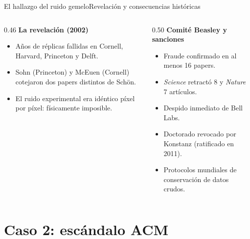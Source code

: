 \documentclass[11pt,aspectratio=169,xcolor=table]{beamer}
\begin{document}
\begin{frame}{El hallazgo del ruido gemelo}{Revelación y consecuencias históricas}
  \begin{columns}[T,onlytextwidth]
    \begin{column}{0.46\textwidth}
      \textbf{La revelación (2002)}
      \begin{itemize}
        \item Años de réplicas fallidas en Cornell, Harvard, Princeton y Delft.
        \item Sohn (Princeton) y McEuen (Cornell) cotejaron dos papers
          distintos de Schön.
        \item El ruido experimental era \alert{idéntico píxel por píxel}:
          físicamente imposible.
      \end{itemize}
    \end{column}
    \begin{column}{0.50\textwidth}
      \textbf{Comité Beasley y sanciones}
      \begin{itemize}
        \item Fraude confirmado en al menos 16 papers.
        \item \emph{Science} retractó 8 y \emph{Nature} 7 artículos.
        \item Despido inmediato de Bell Labs.
        \item Doctorado revocado por Konstanz (ratificado en 2011).
        \item Protocolos mundiales de conservación de datos crudos.
      \end{itemize}
    \end{column}
  \end{columns}
\end{frame}

\section{Caso 2: escándalo ACM}
\end{document}
